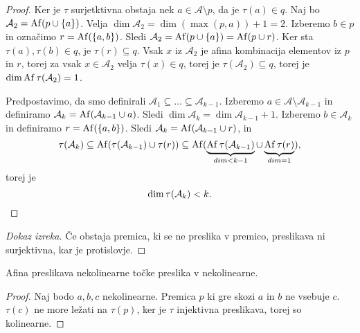 \begin{proof}
    Ker je $\tau$ surjetktivna obstaja nek $a \in \mathcal{A} \setminus p$, da je $\tau (a) \in q$. Naj bo $\mathcal{A}_2 = \operatorname{Af} (p \cup \left\{a\right\})$.
    Velja $\dim \mathcal{A}_2 = \dim (\max (p, {a})) + 1 = 2$. Izberemo $b \in p$ in označimo $r = \operatorname{Af} (\left\{a,b\right\})$.
    Sledi $\mathcal{A}_2 = \operatorname{Af} (p \cup \left\{a\right\}) = \operatorname{Af} (p \cup r)$. Ker sta $\tau (a), \tau (b) \in q$, je $\tau (r) \subseteq q$. Vsak $x$ iz $\mathcal{A}_2$ je afina kombinacija elementov iz $p$ in $r$,
    torej za vsak $x \in \mathcal{A}_2$ velja $\tau (x) \in q$, torej je $\tau (\mathcal{A}_2) \subseteq q$, torej je $\dim \operatorname{Af} \tau (\mathcal{A}_2) = 1$.

    Predpostavimo, da smo definirali $\mathcal{A}_1 \subseteq \dots \subseteq \mathcal{A}_{k-1}$. Izberemo $a \in \mathcal{A} \setminus \mathcal{A}_{k-1}$ in definiramo $\mathcal{A}_k = \operatorname{Af} (\mathcal{A}_{k-1} \cup {a})$.
    Sledi $\dim \mathcal{A}_k = \dim \mathcal{A}_{k-1} + 1$. Izberemo $b \in \mathcal{A}_k$ in definiramo $r = \operatorname{Af} (\left\{a,b\right\})$. Sledi $\mathcal{A}_k = \operatorname{Af} (\mathcal{A}_{k-1} \cup r)$, in
    \[
        \tau (\mathcal{A}_k) \subseteq \operatorname{Af} (\tau (\mathcal{A}_{k-1}) \cup \tau (r)) \subseteq \operatorname{Af} (\underbrace{\operatorname{Af} \tau (\mathcal{A}_{k-1})}_{dim < k - 1} \cup \underbrace{\operatorname{Af} \tau (r)}_{dim = 1}),
    \] torej je
    \[
      \dim \tau (\mathcal{A}_k) < k. \qedhere  
    \]
\end{proof}

\begin{proof}[Dokaz izreka]
    Če obstaja premica, ki se ne preslika v premico, preslikava ni surjektivna, kar je protislovje.
\end{proof}

\begin{posledica}
    Afina preslikava nekolinearne točke preslika v nekolinearne.
\end{posledica}

\begin{proof}
    Naj bodo $a,b,c$ nekolinearne. Premica $p$ ki gre skozi $a$ in $b$ ne vsebuje $c$. $\tau (c)$ ne more ležati na $\tau (p)$, ker je $\tau$ injektivna preslikava, torej so kolinearne.
\end{proof}